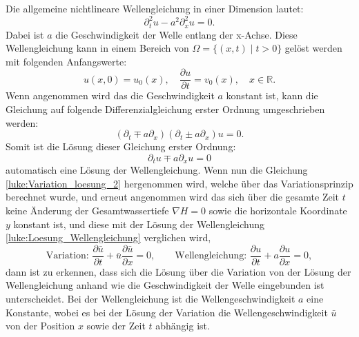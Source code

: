 Die allgemeine nichtlineare Wellengleichung in einer Dimension lautet:
\[
\partial_t^2 u - a^2 \partial_x^2 u  = 0.
\]
Dabei ist $a$ die Geschwindigkeit der Welle entlang der x-Achse.
Diese Wellengleichung kann in einem Bereich von $\Omega = \{(x,t)\mid t >0\}$ gelöst werden mit folgenden Anfangswerte:
\[
u(x,0) = u_0(x),\quad \frac{\partial u}{\partial t} = v_0(x),\quad x \in \mathbb{R}.
\]
Wenn angenommen wird das die Geschwindigkeit $a$ konstant ist, kann die Gleichung auf folgende Differenzialgleichung erster Ordnung umgeschrieben werden:
\[
(\partial_t\mp a\partial_x)(\partial_t\pm a\partial_x) u  = 0.
\]
Somit ist die Lösung dieser Gleichung erster Ordnung:
\begin{equation}
	\partial_t u \mp a\partial_x u = 0
	\label{luke:Loesung_Wellengleichung}
\end{equation}
automatisch eine Lösung der Wellengleichung.
Wenn nun die Gleichung \eqref{luke:Variation_loesung_2} hergenommen wird, welche über das Variationsprinzip berechnet wurde, und erneut angenommen wird das sich über die gesamte Zeit $t$ keine Änderung der Gesamtwassertiefe $ \nabla H = 0 $ sowie die horizontale Koordinate $y$ konstant ist, und diese mit der Lösung der Wellengleichung \eqref{luke:Loesung_Wellengleichung} verglichen wird,
\[
\text{Variation: }\frac{\partial \bar{u}}{\partial t} + \bar{u} \frac{\partial \bar{u}}{\partial x} = 0,
\qquad
\text{Wellengleichung: }\frac{\partial u}{\partial t} + a \frac{\partial u}{\partial x} = 0,
\]
dann ist zu erkennen, dass sich die Lösung über die Variation von der Lösung der Wellengleichung anhand wie die Geschwindigkeit der Welle eingebunden ist unterscheidet.
Bei der Wellengleichung ist die Wellengeschwindigkeit $a$ eine Konstante, wobei es bei der Lösung der Variation die Wellengeschwindigkeit $\bar{u}$ von der Position $x$ sowie der Zeit $t$ abhängig ist.